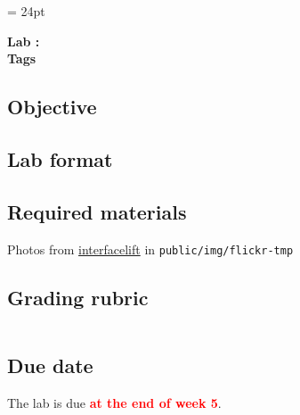 \documentclass{article}
\newcommand{\labduedate}{at the end of week 5}
\begin{document}
\chead{\textcolor{Gray}{CSSE491 -- Scalable Computing Lab Assignment}}
\headsep = 24pt

\begin{center}
{ \large
\textbf{Lab \labnumber: \longproductname} \\
\textbf{Tags}
}
\end{center}

\subsection*{Objective}

\subsection*{Lab format}

\subsection*{Required materials}
Photos from \href{http://interfacelift.com}{interfacelift} in \verb!public/img/flickr-tmp!

\subsection*{Grading rubric}
\begin{tabular}{p{5.5in} r}
\end{tabular}

\subsection*{Due date}
The lab is due \textcolor{red}{\textbf{\labduedate}}.




\end{document}

